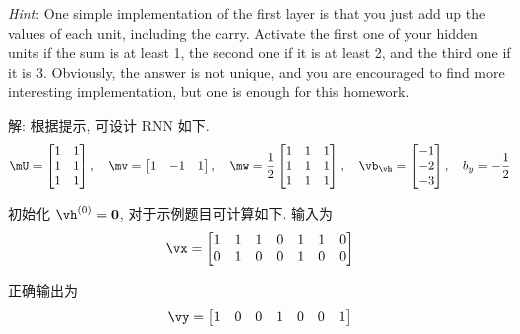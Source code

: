 \documentclass[openany]{ctexbook}
\theoremstyle{kaiti}
\theoremstyle{normal}
\begin{document}
\emph{Hint}: One simple implementation of the first layer is that you just add up the values of each unit, including the carry. Activate the first one of your hidden units if the sum is at least 1, the second one if it is at least 2, and the third one if it is 3. Obviously, the answer is not unique, and you are encouraged to find more interesting implementation, but one is enough for this homework.

解: 根据提示, 可设计 RNN 如下.
\begin{equation}
  \mU=\begin{bmatrix}
    1 & 1 \\
    1 & 1 \\
    1 & 1 \\
  \end{bmatrix},\quad
  \mv=\begin{bmatrix}
    1 & -1 & 1 \\
  \end{bmatrix},\quad
  \mw=\frac{1}{2}\begin{bmatrix}
    1 & 1 & 1 \\
    1 & 1 & 1 \\
    1 & 1 & 1 \\
  \end{bmatrix},\quad
  \vb_{\vh}=\begin{bmatrix}
    -1 \\ -2 \\ -3 \\
  \end{bmatrix},\quad
  b_y=-\frac{1}{2}
\end{equation}

初始化 $\vh^{(0)}=\bm{0}$, 对于示例题目可计算如下. 输入为
\begin{equation}
  \vx=\begin{bmatrix}
    1 & 1 & 1 & 0 & 1 & 1 & 0 \\
    0 & 1 & 0 & 0 & 1 & 0 & 0 \\
  \end{bmatrix}
\end{equation}

正确输出为
\begin{equation}
  \vy=\begin{bmatrix}
    1 & 0 & 0 & 1 & 0 & 0 & 1 \\
  \end{bmatrix}
\end{equation}
\end{document}
